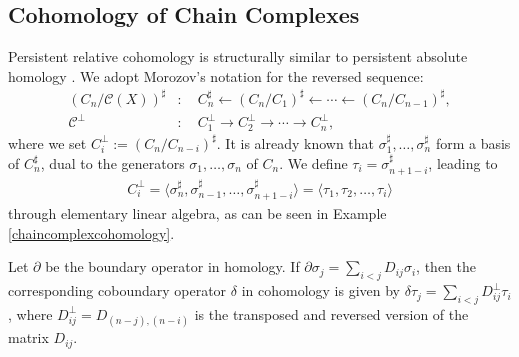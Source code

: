 \subsection{Cohomology of Chain Complexes}
Persistent relative cohomology is structurally similar to persistent absolute homology \cite[\S 2.7]{de2011dualities}. We adopt Morozov's notation for the reversed sequence:
\begin{align}
	(C_n / \mathcal{C}(X))^\sharp &: \quad C_n^\sharp \leftarrow (C_n / C_1)^\sharp \leftarrow \cdots \leftarrow (C_n / C_{n-1})^\sharp, \\
	\mathcal{C}^\perp &: \quad C_1^\perp \rightarrow C_2^\perp \rightarrow \cdots \rightarrow C_n^\perp,
\end{align}
where we set \( C_i^\perp := (C_n / C_{n-i})^\sharp \). It is already known that \( \sigma_1^\sharp, \ldots, \sigma_n^\sharp \) form a basis of \( C_n^\sharp \), dual to the generators \( \sigma_1, \ldots, \sigma_n \) of \( C_n \). We define \( \tau_i = \sigma^\sharp_{n+1-i} \), leading to
\begin{align}
	C_i^\perp = \langle \sigma_n^\sharp, \sigma_{n-1}^\sharp, \ldots, \sigma_{n+1-i}^\sharp \rangle = \langle \tau_1, \tau_2, \ldots, \tau_i \rangle
\end{align}
through elementary linear algebra, as can be seen in Example \ref{chaincomplexcohomology}.

\begin{proposition}
Let \( \partial \) be the boundary operator in homology. If \( \partial \sigma_j = \sum_{i < j} D_{ij} \sigma_i \), then the corresponding coboundary operator \( \delta \) in cohomology is given by $\delta \tau_j = \sum_{i < j} D_{ij}^\perp \tau_i$, where \( D_{ij}^\perp = D_{(n-j),(n-i)} \) is the transposed and reversed version of the matrix \( D_{ij} \). 
\end{proposition}

